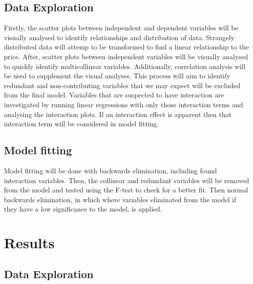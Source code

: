 \documentclass[10pt,A4,makeidx]{article}
\begin{document}
  \subsection{Data Exploration}
  Firstly, the scatter plots between independent and dependent variables will be 
  visually analysed to identify relationships and distribution of data. Strangely
  distributed data will attemp to be transformed to find a linear relationship to 
  the price. After, scatter plots between independent variables will be visually analysed to quickly 
  identify multicollinear variables. Additionally, correlation analysis will be used to 
  supplement the visual analyses. This process will aim to identify redundant and 
  non-contributing variables that we may expect will be excluded from the 
  final model.  
  Variables that are suspected to have interaction are investigated by running linear 
  regressions with only those interaction terms and analysing the interaction plots.
  If an interaction effect is apparent then that interaction term will be considered
  in model fitting.
  \subsection{Model fitting}
  Model fitting will be done with backwards elimination, including found interaction 
  variables. Then, the collinear and redundant variables will be removed from the 
  model and tested using the F-test to check for a better fit. Then normal backwards elimination, in which 
  where variables eliminated from the model if they have a low significance to the model, is applied.
\section{Results}
  \subsection{Data Exploration}
\end{document}
